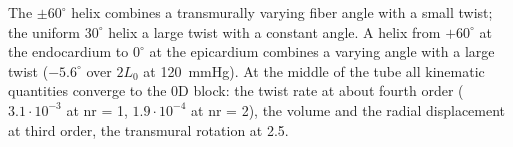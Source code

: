The $\pm60^\circ$ helix combines a transmurally varying fiber angle with a small twist;
the uniform $30^\circ$ helix a large twist with a constant angle. A helix from $+60^\circ$
at the endocardium to $0^\circ$ at the epicardium combines a varying angle with a large
twist ($-5.6^\circ$ over $2L_0$ at 120~mmHg). At the middle of the tube all kinematic
quantities converge to the 0D block: the twist rate at about fourth order
($3.1\cdot10^{-3}$ at nr = 1, $1.9\cdot10^{-4}$ at nr = 2), the volume and the radial
displacement at third order, the transmural rotation at 2.5.
